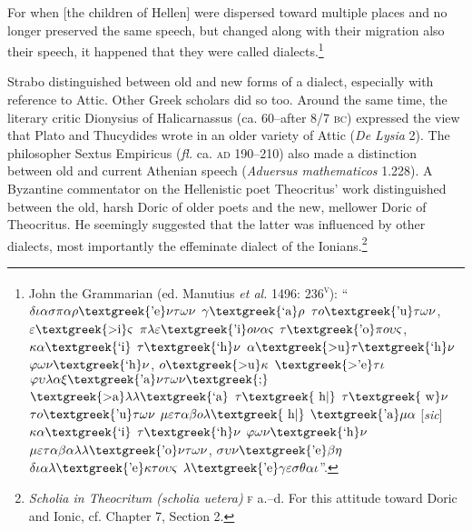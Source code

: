 \begin{styleQuote}
For when [the children of Hellen] were dispersed toward multiple places and no longer preserved the same speech, but changed along with their migration also their speech, it happened that they were called dialects.\footnote{ John the Grammarian (ed. Manutius \textit{et al.} 1496: 236\textsc{\textsuperscript{v}}): “$\delta \iota \alpha \sigma \pi \alpha \rho \text{\textgreek{'e}}\nu \tau \omega \nu $ $\gamma \text{\textgreek{`a}}\rho $ $\tau o\text{\textgreek{'u}}\tau \omega \nu $, $\varepsilon \text{\textgreek{>i}}\varsigma $ $\pi \lambda \varepsilon \text{\textgreek{'i}}o\nu \alpha \varsigma $ $\tau \text{\textgreek{'o}}\pi o\upsilon \varsigma $, $\kappa \alpha \text{\textgreek{`i}}$ $\tau \text{\textgreek{`h}}\nu $ $\alpha \text{\textgreek{>u}}\tau \text{\textgreek{`h}}\nu $ $\varphi \omega \nu \text{\textgreek{`h}}\nu $, $o\text{\textgreek{>u}}\kappa $ $\text{\textgreek{>'e}}\tau \iota $ $\varphi \upsilon \lambda \alpha \xi \text{\textgreek{'a}}\nu \tau \omega \nu \text{\textgreek{;}}$ $\text{\textgreek{>a}}\lambda \lambda \text{\textgreek{`a}}$ $\tau \text{\textgreek{~h|}}$ $\tau \text{\textgreek{~w}}\nu $ $\tau o\text{\textgreek{'u}}\tau \omega \nu $ $\mu \varepsilon \tau \alpha \beta o\lambda \text{\textgreek{~h|}}$ $\text{\textgreek{'a}}\mu \alpha $ [\textit{sic}] $\kappa \alpha \text{\textgreek{`i}}$ $\tau \text{\textgreek{`h}}\nu $ $\varphi \omega \nu \text{\textgreek{`h}}\nu $ $\mu \varepsilon \tau \alpha \beta \alpha \lambda \lambda \text{\textgreek{'o}}\nu \tau \omega \nu $, $\sigma \upsilon \nu \text{\textgreek{'e}}\beta \eta $ $\delta \iota \alpha \lambda \text{\textgreek{'e}}\kappa \tau o\upsilon \varsigma $ $\lambda \text{\textgreek{'e}}\gamma \varepsilon \sigma \theta \alpha \iota $”.}
\end{styleQuote}

\begin{styleStandard}
Strabo distinguished between old and new forms of a dialect, especially with reference to Attic. Other Greek scholars did so too. Around the same time, the literary critic Dionysius of Halicarnassus (ca. 60–after 8/7 \textsc{bc}) expressed the view that Plato and Thucydides wrote in an older variety of Attic (\textit{De Lysia} 2). The philosopher Sextus Empiricus (\textit{fl.} ca. \textsc{ad} 190–210) also made a distinction between old and current Athenian speech (\textit{Aduersus mathematicos} 1.228). A Byzantine commentator on the Hellenistic poet Theocritus’ work distinguished between the old, harsh Doric of older poets and the new, mellower Doric of Theocritus. He seemingly suggested that the latter was influenced by other dialects, most importantly the effeminate dialect of the Ionians.\footnote{ \textit{Scholia in Theocritum (scholia uetera)} \textsc{f }a.–d. For this attitude toward Doric and Ionic, cf. Chapter 7, Section 2.}
\end{styleStandard}

